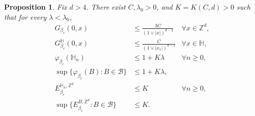 \documentclass[11pt,a4paper]{article}
\numberwithin{equation}{section}
\theoremstyle{plain}
\newtheorem{Prop}[Thm]{Proposition}
\theoremstyle{definition}
\begin{document}
\begin{Prop}\label{prop: theorem beta start = beta_c}
Fix $d>4$. There exist $C,\lambda_0>0$, and $K=K(C,d)>0$ such that for every $\lambda<\lambda_0$,
\begin{align}
G_{\beta_c}(0,x)&\le \frac{3C}{(1\vee|x|)^{d-2}}&\forall x\in \mathbb Z^d,\label{eq:upper bound below L}\\
G_{\beta_c}^{\mathbb H}(0,x)&\le \frac{C}{(1\vee|x_1|)^{d-1}}&\forall x\in \mathbb H
\label{eq:upper half-spacebound below L},\\
\label{eq: bound phi_n final prop}
\varphi_{\beta_c}(\mathbb H_n)&\le 1+K\lambda &\forall n\ge0,\\
\sup\{\varphi_{\beta_c}(B):B\in \mathcal B\}&\le 1+K\lambda, &\\
E^{\mathbb H_n,\mathbb Z^d}_{\beta_c}&\leq K &\forall n\geq 0,
\\
\sup\big\{E^{B,\mathbb Z^d}_{\beta_c}:B\in \mathcal B\big\}&\leq K. &\label{eq:general bound error last prop}
\end{align} 
\end{Prop}
\end{document}
